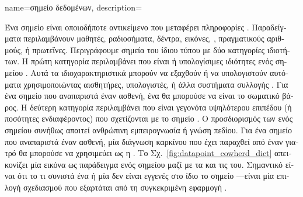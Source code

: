 {name={\foreignlanguage{greek}{σημείο δεδομένων}},
	description={\foreignlanguage{greek}{Ένα σημείο}  
		\foreignlanguage{greek}{είναι οποιοδήποτε αντικείμενο που μεταφέρει πληροφορίες} \cite{coverthomas}. 
		\foreignlanguage{greek}{Παραδείγματα περιλαμβάνουν μαθητές, ραδιοσήματα, δέντρα, εικόνες,} , 
		\foreignlanguage{greek}{πραγματικούς αριθ\-μούς, ή πρωτεΐνες. Περιγράφουμε σημεία}  
		\foreignlanguage{greek}{του ίδιου τύπου με δύο κατηγορίες ιδιοτήτων.} 
		\foreignlanguage{greek}{Η πρώτη κατηγορία περιλαμβάνει}  \foreignlanguage{greek}{που είναι}  
		 \foreignlanguage{greek}{ή υπολογίσιμες ιδιότητες ενός σημείου} . 
    		\foreignlanguage{greek}{Αυτά τα ιδιοχαρακτηριστικά μπορούν να εξαχθούν ή να υπολογιστούν αυτόματα χρησιμοποιώντας 
		αισθητήρες, υπολογιστές, ή άλλα συστήματα συλλογής} . \foreignlanguage{greek}{Για ένα σημείο}  
		 \foreignlanguage{greek}{που αναπαριστά έναν ασθενή, ένα}  
		\foreignlanguage{greek}{θα μπορούσε να είναι το σωματικό βάρος.
    		Η δεύτερη κατηγορία περιλαμβάνει}  \foreignlanguage{greek}{που είναι γεγονότα υψηλότερου
		επιπέδου (ή ποσότητες ενδιαφέροντος) που σχετίζονται με το σημείο} .
		\foreignlanguage{greek}{Ο προσδιορισμός των}  \foreignlanguage{greek}{ενός σημείου} 
		 \foreignlanguage{greek}{συνήθως απαιτεί ανθρώπινη εμπειρογνωσία ή γνώση πεδίου. 
		Για ένα σημείο}  \foreignlanguage{greek}{που αναπαριστά έναν ασθενή,
		μία διάγνωση καρκίνου που έχει παραχθεί από έναν γιατρό θα μπορούσε να χρησιμεύει ως η} .
		\foreignlanguage{greek}{Το Σχ.}\ \ref{fig:datapoint_cowherd_dict} \foreignlanguage{greek}{απεικονίζει μία εικόνα ως παράδειγμα ενός σημείου} 
		 \foreignlanguage{greek}{μαζί με τα}  \foreignlanguage{greek}{και τις} 
		 \foreignlanguage{greek}{του. Σημαντικό είναι ότι το τι συνιστά ένα}  
		 \foreignlanguage{greek}{ή μία}  \foreignlanguage{greek}{δεν είναι εγγενές στο ίδιο 
		το σημείο} —\foreignlanguage{greek}{είναι μία επιλογή σχεδιασμού που εξαρτάται από τη συγκεκριμένη 
		εφαρμογή} .
		\begin{figure}[H]
    		\centering

\end{figure}}}
